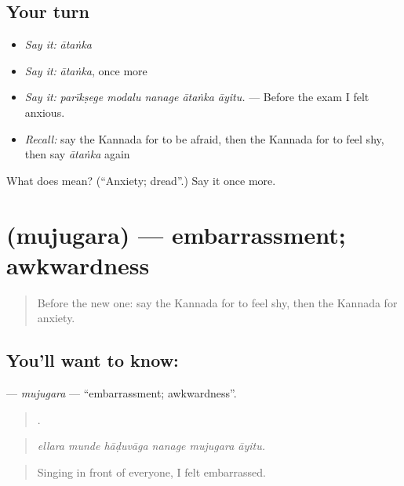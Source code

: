 \subsection*{Your turn}
\begin{itemize}
\raggedright
  \item \emph{Say it:} \emph{ātaṅka}
  \item \emph{Say it:} \emph{ātaṅka}, once more
  \item \emph{Say it:} \emph{parīkṣege modalu nanage ātaṅka āyitu.} — Before the exam I felt anxious.
  \item \emph{Recall:} say the Kannada for to be afraid, then the Kannada for to feel shy, then say \emph{ātaṅka} again
\end{itemize}

\begin{tcolorbox}[breakable,colback=teal!4,colframe=teal!35!black,title={Before you move on}]
What does  mean? (\textquotedblleft{}Anxiety; dread\textquotedblright{}.) Say it once more.
\end{tcolorbox}
\section[\texorpdfstring{\kn{ಮುಜುಗರ} (mujugara)}{ಮುಜುಗರ (mujugara)}]{ (mujugara) — embarrassment; awkwardness}

\label{lesson:KA-C490-mujugara}



\begin{quote}
Before the new one: say the Kannada for to feel shy, then the Kannada for anxiety.
\end{quote}

\subsection*{You'll want to know: }
\textbf{} — \emph{mujugara} — \textquotedblleft{}embarrassment; awkwardness\textquotedblright{}.

\begin{quote}
     .
\end{quote}

\begin{quote}
\emph{ellara munde hāḍuvāga nanage mujugara āyitu.}
\end{quote}

\begin{quote}
Singing in front of everyone, I felt embarrassed.
\end{quote}

